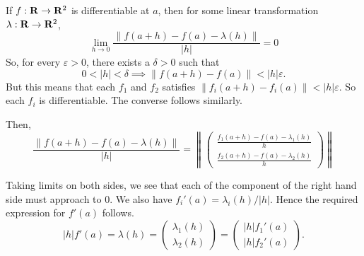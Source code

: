\begin{solution}
    If $f:\mathbf{R}\to\mathbf{R}^2$ is differentiable
    at $a$, 
    then for some linear
    transformation $\lambda:\mathbf{R}\to\mathbf{R}^2$,
    $$\lim_{h\to 0}
    {\frac{\|f(a+h)-f(a)-\lambda(h)\|}
    {\vert h\vert}}
    =0$$
    So, for every $\varepsilon>0$, there
    exists a $\delta>0$ such that
    $$0<\vert h\vert <\delta\implies
    \|f(a+h)-f(a)\|<
    \vert h\vert\varepsilon.$$
    But this means that each $f_1$ and
    $f_2$ satisfies
    $\|f_i(a+h)-f_i(a)\|<\vert h\vert
    \varepsilon.$ So each $f_i$ is
    differentiable. The converse follows
    similarly.

    Then,
    $$\frac{\|f(a+h)-f(a)-\lambda(h)\|}
    {\vert h\vert}=\left\lVert\left(
        \begin{matrix}
        \frac{f_1(a+h)-f(a)-\lambda_1(h)}
        {h}\\
        \frac{f_2(a+h)-f(a)-\lambda_2(h)}
        {h}
        \end{matrix}\right)\right\rVert$$
    
    Taking limits on both sides,
    we see that each of the component
    of the right
    hand side must approach to
     $0$. We also have
    $f_i'(a)=\lambda_i(h)/\vert h\vert.$
    Hence the
    required expression for $f'(a)$
    follows.
    $$\vert h\vert f'(a)=
    \lambda(h) =
    \left(
    \begin{matrix}
        \lambda_1(h)\\
        \lambda_2(h)
    \end{matrix}\right)
    =
    \left(
    \begin{matrix}
        \vert h\vert f_1'(a)\\
        \vert h\vert f_2'(a)
    \end{matrix}\right).
    $$
\end{solution}